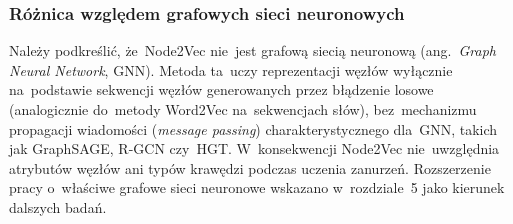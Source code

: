 \subsubsection{Różnica względem grafowych sieci neuronowych}

Należy podkreślić, że~Node2Vec nie~jest grafową siecią neuronową
(ang.\ \emph{Graph Neural Network}, GNN). Metoda ta~uczy reprezentacji
węzłów wyłącznie na~podstawie sekwencji węzłów generowanych przez
błądzenie losowe (analogicznie do~metody Word2Vec na~sekwencjach
słów), bez~mechanizmu propagacji wiadomości (\emph{message passing})
charakterystycznego dla~GNN, takich jak GraphSAGE, R-GCN czy~HGT.
W~konsekwencji Node2Vec nie~uwzględnia atrybutów węzłów ani
typów krawędzi podczas uczenia zanurzeń. Rozszerzenie pracy
o~właściwe grafowe sieci neuronowe wskazano w~rozdziale~5 jako
kierunek dalszych badań.
